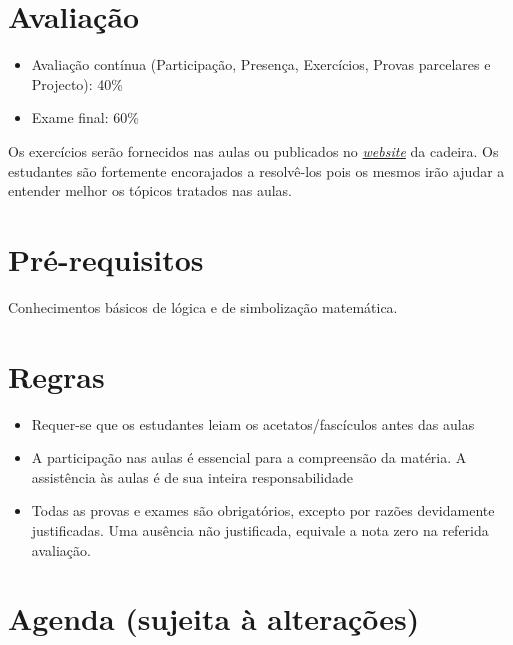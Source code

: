 \section*{Avaliação}%
\begin{itemize}
  \item Avaliação contínua (Participação, Presença, Exercícios, Provas
  parcelares e Projecto): 40\%
  \item Exame final: 60\%
\end{itemize}

Os exercícios serão fornecidos nas aulas ou publicados no
\href{www.dizando.me/ed2018}{\emph{website}} da cadeira. Os estudantes são
fortemente encorajados a resolvê-los pois os mesmos irão ajudar a entender
melhor os tópicos tratados nas aulas.
%
\section*{Pré-requisitos}

Conhecimentos básicos de lógica e de simbolização matemática.

\section*{Regras}

\begin{itemize}
  \item {Requer-se que os estudantes leiam os acetatos/fascículos antes das
  aulas}
  \item {A participação nas aulas é essencial para a compreensão da matéria. A assistência às aulas é de sua inteira
  responsabilidade}
  \item {Todas as provas e exames são obrigatórios, excepto por razões devidamente justificadas. Uma ausência não justificada, 
  equivale a nota zero na referida avaliação.}
\end{itemize}

\section*{Agenda (sujeita à alterações)}

